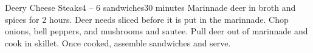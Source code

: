 \documentclass[../cookbook.tex]{subfiles}
\begin{document}
\begin{recipe}{Deery Cheese Steaks}{4 -- 6 sandwiches}{30 minutes}
    Marinnade deer in broth and spices for 2 hours. Deer needs sliced before it
    is put in the marinnade.
    Chop onions, bell peppers, and mushrooms and sautee. Pull deer out of
    marinnade and cook in skillet. Once cooked, assemble sandwiches and serve.

\end{recipe}
\end{document}
